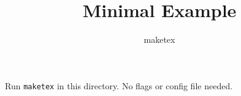 \documentclass{article}
\title{Minimal Example}
\author{maketex}
\begin{document}
\maketitle

Run \texttt{maketex} in this directory. No flags or config file needed.
\end{document}

